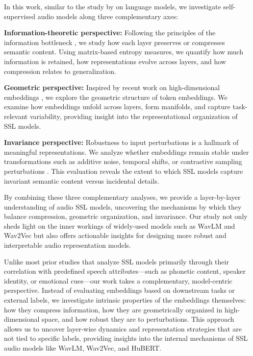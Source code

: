 \documentclass{Interspeech}
\begin{document}
In this work, similar to the study by \cite{skean2025layer} on language models, we investigate self-supervised audio models along three complementary axes:

\textbf{Information-theoretic perspective:} Following the principles of the information bottleneck \cite{shwartz2017opening}, we study how each layer preserves or compresses semantic content. Using matrix-based entropy measures, we quantify how much information is retained, how representations evolve across layers, and how compression relates to generalization.

\textbf{Geometric perspective:} Inspired by recent work on high-dimensional embeddings \cite{hosseini2023large}, we explore the geometric structure of token embeddings. We examine how embeddings unfold across layers, form manifolds, and capture task-relevant variability, providing insight into the representational organization of SSL models.

\textbf{Invariance perspective:} Robustness to input perturbations is a hallmark of meaningful representations. We analyze whether embeddings remain stable under transformations such as additive noise, temporal shifts, or contrastive sampling perturbations \cite{oord2018representation, thilak2023lidar, skean2023dime}. This evaluation reveals the extent to which SSL models capture invariant semantic content versus incidental details.

By combining these three complementary analyses, we provide a layer-by-layer understanding of audio SSL models, uncovering the mechanisms by which they balance compression, geometric organization, and invariance. Our study not only sheds light on the inner workings of widely-used models such as WavLM and Wav2Vec but also offers actionable insights for designing more robust and interpretable audio representation models.

Unlike most prior studies \cite{chiu2025probing} that analyze SSL models primarily through their correlation with predefined speech attributes—such as phonetic content, speaker identity, or emotional cues—our work takes a complementary, model-centric perspective. Instead of evaluating embeddings based on downstream tasks or external labels, we investigate intrinsic properties of the embeddings themselves: how they compress information, how they are geometrically organized in high-dimensional space, and how robust they are to perturbations. This approach allows us to uncover layer-wise dynamics and representation strategies that are not tied to specific labels, providing insights into the internal mechanisms of SSL audio models like WavLM, Wav2Vec, and HuBERT.
\end{document}
